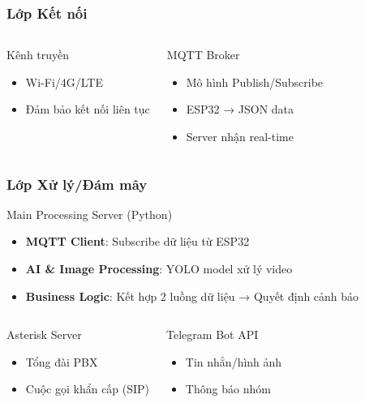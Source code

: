 \begin{frame}
\frametitle{Lớp Kết nối}

\begin{columns}
\begin{block}{Kênh truyền}
\begin{itemize}
\item Wi-Fi/4G/LTE
\item Đảm bảo kết nối liên tục
\end{itemize}
\end{block}

\begin{block}{MQTT Broker}
\begin{itemize}
\item Mô hình Publish/Subscribe
\item ESP32 → JSON data
\item Server nhận real-time
\end{itemize}
\end{block}
\end{columns}

\end{frame}

\begin{frame}
\frametitle{Lớp Xử lý/Đám mây}

\begin{block}{Main Processing Server (Python)}
\begin{itemize}
\item \textbf{MQTT Client}: Subscribe dữ liệu từ ESP32
\item \textbf{AI \& Image Processing}: YOLO model xử lý video
\item \textbf{Business Logic}: Kết hợp 2 luồng dữ liệu → Quyết định cảnh báo
\end{itemize}
\end{block}

\begin{columns}
\begin{block}{Asterisk Server}
\begin{itemize}
\item Tổng đài PBX
\item Cuộc gọi khẩn cấp (SIP)
\end{itemize}
\end{block}

\begin{block}{Telegram Bot API}
\begin{itemize}
\item Tin nhắn/hình ảnh
\item Thông báo nhóm
\end{itemize}
\end{block}
\end{columns}

\end{frame}


